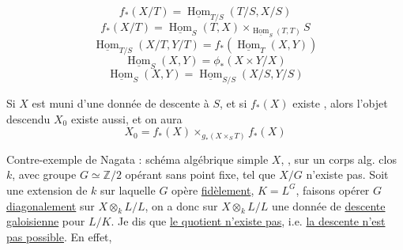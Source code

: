 \[
f_*(X/T)=\underline{\operatorname{Hom}}_{T/S}(T/S,X/S)
\]
\[
f_*(X/T)=\underline{\operatorname{Hom}}_S(T,X)\times_{\underline{\operatorname{Hom}}_S(T,T)}S
\]
\[
\underline{\operatorname{Hom}}_{T/S}(X/T,Y/T)=f_*(\underline{\operatorname{Hom}}_T(X,Y))
\]
\[
\underline{\operatorname{Hom}}_S(X,Y)=\phi_*(X\times Y/X)
\]
\[
\underline{\operatorname{Hom}}_S(X,Y)=\underline{\operatorname{Hom}}_{S/S}(X/S,Y/S)
\]

Si $X$ est muni d'une donnée de descente à $S$, et si $f_*(X)$ existe , alors l'objet descendu $X_0$ existe aussi, et on aura
\[
X_0=f_*(X)\times_{g_*(X\times_S T)}f_*(X)
\]

Contre-exemple de Nagata : schéma algébrique simple $X$, , sur un corps alg. clos $k$, avec groupe $G\simeq\mathbb Z/2$ opérant sans point fixe, tel que $X/G$ n'existe pas. Soit  une extension de $k$ sur laquelle $G$ opère \uline{fidèlement},  $K=L^G$, faisons opérer $G$ \uline{diagonalement} sur $X\otimes_k L/L$, on a donc sur $X\otimes_k L/L$ une donnée de \uline{descente galoisienne} pour $L/K$. Je dis que \uline{le quotient n'existe pas}, i.e. \uline{la descente n'est pas possible}. En effet, 

